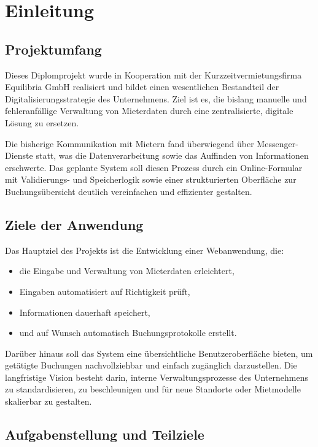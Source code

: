 \chapter{Einleitung} 

\section{Projektumfang}

Dieses Diplomprojekt wurde in Kooperation mit der Kurzzeitvermietungsfirma Equilibria GmbH realisiert und bildet einen wesentlichen Bestandteil der Digitalisierungsstrategie des Unternehmens. Ziel ist es, die bislang manuelle und fehleranfällige Verwaltung von Mieterdaten durch eine zentralisierte, digitale Lösung zu ersetzen.

Die bisherige Kommunikation mit Mietern fand überwiegend über Messenger-Dienste statt, was die Datenverarbeitung sowie das Auffinden von Informationen erschwerte. Das geplante System soll diesen Prozess durch ein Online-Formular mit Validierungs- und Speicherlogik sowie einer strukturierten Oberfläche zur Buchungsübersicht deutlich vereinfachen und effizienter gestalten.

\section{Ziele der Anwendung}

Das Hauptziel des Projekts ist die Entwicklung einer Webanwendung, die:

\begin{itemize}
    \item die Eingabe und Verwaltung von Mieterdaten erleichtert,
    \item Eingaben automatisiert auf Richtigkeit prüft,
    \item Informationen dauerhaft speichert,
    \item und auf Wunsch automatisch Buchungsprotokolle erstellt.
\end{itemize}

Darüber hinaus soll das System eine übersichtliche Benutzeroberfläche bieten, um getätigte Buchungen nachvollziehbar und einfach zugänglich darzustellen. Die langfristige Vision besteht darin, interne Verwaltungsprozesse des Unternehmens zu standardisieren, zu beschleunigen und für neue Standorte oder Mietmodelle skalierbar zu gestalten.

\section{Aufgabenstellung und Teilziele}

